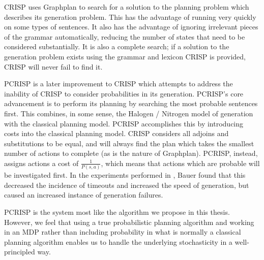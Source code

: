 CRISP uses Graphplan to search for a solution to the planning
problem which describes its generation problem.  This has
the advantage of running very quickly on some types of
sentences.  It also has the advantage of ignoring irrelevant
pieces of the grammar automatically, reducing the number
of states that need to be considered substantially.
It is also a complete search; if a solution to the generation
problem exists using the grammar and lexicon CRISP is provided,
CRISP will never fail to find it.

PCRISP \cite{bauer_sentence_2010} is a later improvement to
CRISP which attempts to address the inability of CRISP to consider
probabilities in its generation.  PCRISP's core advancement is
to perform its planning by searching the most probable sentences
first.  This combines, in some sense, the Halogen / Nitrogen model
of generation with the classical planning model.  PCRISP accomplishes
this by introducing costs into the classical planning model.
CRISP considers all adjoins and substitutions to be equal, and
will always find the plan which takes the smallest number of actions
to complete (as is the nature of Graphplan).  PCRISP, instead,
assigns actions a cost of $\frac{1}{P(s,a)}$, which means that
actions which are probable will be investigated first.  In the
experiments performed in \cite{bauer2009statistical},
Bauer found that this decreased the incidence of timeouts and
increased the speed of generation, but caused an increased instance of
generation failures.

PCRISP is the system most like the algorithm we propose in this thesis.
However, we feel that using a true probabilistic planning algorithm
and working in an MDP rather than including probability in what
is normally a classical planning algorithm enables us to handle
the underlying stochasticity in a well-principled way.